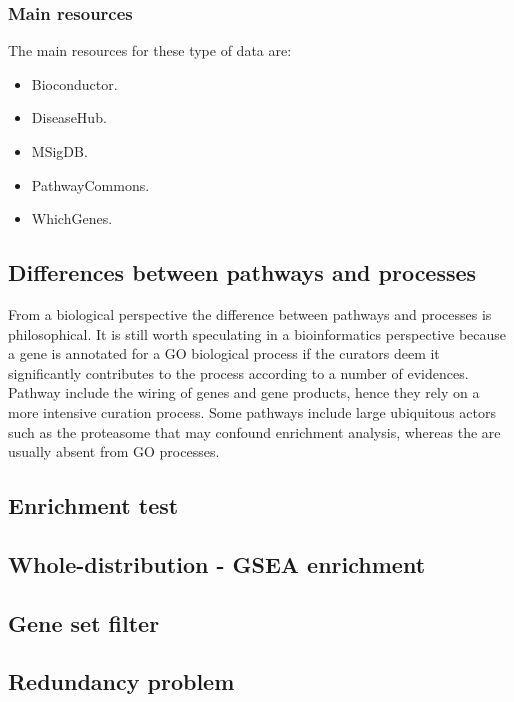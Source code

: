 		\subsubsection{Main resources}
		The main resources for these type of data are:

		\begin{multicols}{2}
			\begin{itemize}
				\item Bioconductor.
				\item DiseaseHub.
				\item MSigDB.
				\item PathwayCommons.
				\item WhichGenes.
			\end{itemize}
		\end{multicols}

	\subsection{Differences between pathways and processes}
	From a biological perspective the difference between pathways and processes is philosophical.
	It is still worth speculating in a bioinformatics perspective because a gene is annotated for a GO biological process if the curators deem it significantly contributes to the process according to a number of evidences.
	Pathway include the wiring of genes and gene products, hence they rely on a more intensive curation process.
	Some pathways include large ubiquitous actors such as the proteasome that may confound enrichment analysis, whereas the are usually absent from GO processes.

	\subsection{Enrichment test}

	\subsection{Whole-distribution - GSEA enrichment}

	\subsection{Gene set filter}

	\subsection{Redundancy problem}
